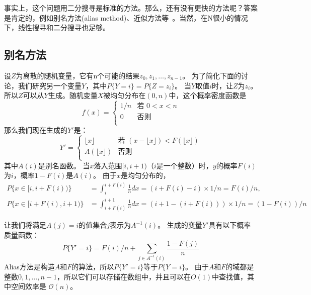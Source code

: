 事实上，这个问题用二分搜寻是标准的方法。那么，还有没有更快的方法呢？答案是肯定的，例如别名方法(alias method)、近似方法等~。当然，在N很小的情况下，线性搜寻和二分搜寻也足够。
\subsection{别名方法}

设$ Z $为离散的随机变量，它有n个可能的结果$ z_0,z_1,\ldots,z_ {n-1} $。 为了简化下面的讨论，我们研究另一个变量$ Y $，其中$ P \{Y = i \} = P \{Z = z_i \} $。 当$ Y $取值$ i $时，让$ Z $为$ z_i $。 所以$ Z $可以从$ Y $生成。随机变量$ X $被均匀分布在$(0,n)$中，这个概率密度函数是
\begin{equation}\label{equ:alias}
 f(x) = \left\{
 \begin{array}{rl}
  1/n & \text{若 } 0 < x < n\\
  0 & \text{否则}\\
 \end{array} \right.
\end{equation}
那么我们现在生成的$Y'$是：
\begin{equation}\label{equ:gen}
  Y' =  \left\{
 \begin{array}{rl}
  \lfloor x  \rfloor & \text{若 } (x - \lfloor x \rfloor) < F(\lfloor x \rfloor)\\
  A(\lfloor x \rfloor)  & \text{否则}\\
 \end{array} \right.
\end{equation}
其中$ A(i)$是别名函数。 当$ x $落入范围$ [i,i + 1)$（$ i $是一个整数）时，$ y $的概率$ F(i)$为$ i $，概率$ 1 - F(i )$是$ A(i)$。 由于$ x $是均匀分布的，
\begin{equation}
  \begin{split}
P\{x \in [i, i + F(i))\}     &= \int_i^{i+F(i)}\frac{1}{n}dx= (i + F(i) - i) \times 1/n= F(i)/n,\\
P\{x \in [i + F(i), i + 1)\} &= \int_{i+F(i)}^{i+1}\frac{1}{n}dx= (i + 1 - (i + F(i))) \times 1/n= (1-F(i))/n
\end{split}
\end{equation}

让我们将满足$ A(j)= i $的值集合$ j $表示为$ A ^ { - 1}(i)$。 生成的变量$ Y'$具有以下概率质量函数：
\begin{equation}
  P\{Y' = i\} = F(i)/n + \sum_{j \in A^{-1}(i)}\frac{1-F(j)}{n}
\end{equation}
Alias方法是构造$ A $和$ F $的算法，所以$ P \{Y'= i \} $等于$ P\{Y = i \} $。 由于$ A $和$ F $的域都是整数$ 0,1,\ldots, n-1 $，所以它们可以存储在数组中，并且可以在$O(1)$中查找值，其中空间效率是 $\mathcal{O}(n)$。


